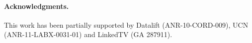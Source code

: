 \documentclass[runningheads,a4paper]{../../Util/LaTEX/llncs}
\begin{document}

\paragraph{\textbf{Acknowledgments.}} %
This work has been partially supported by Datalift (ANR-10-CORD-009), UCN (ANR-11-LABX-0031-01) and LinkedTV (GA 287911).


\nocite{*}

\end{document}
